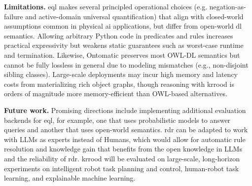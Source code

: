 \documentclass[a4paper,fleqn]{cas-sc}
\begin{document}
\textbf{Limitations.}
\ac{eql} makes several principled operational choices (e.g. negation-as-failure and active-domain universal quantification) that align with closed-world assumptions common in physical \ac{ai} applications, but differ from open-world \ac{dl} semantics. Allowing arbitrary Python code in predicates and rules increases practical expressivity but weakens static guarantees such as worst-case runtime and termination. Likewise, Ontomatic preserves most OWL-DL semantics but cannot be fully lossless in general due to modeling mismatches (e.g., non-disjoint sibling classes). Large-scale deployments may incur high memory and latency costs from materializing rich object graphs, though reasoning with \ac{krrood} is orders of magnitude more memory-efficient than OWL-based alternatives.

\textbf{Future work.}
Promising directions include implementing additional evaluation backends for \ac{eql}, for example, one that uses probabilistic models to answer queries and another that uses open-world semantics. \ac{rdr} can be adapted to work with LLMs as experts instead of Humans, which would allow for automatic rule resolution and knowledge gain that benefits from the open knowledge in LLMs and the reliability of \ac{rdr}. \Ac{krrood} will be evaluated on large-scale, long-horizon experiments on intelligent robot task planning and control, human-robot task learning, and explainable machine learning.




\end{document}
